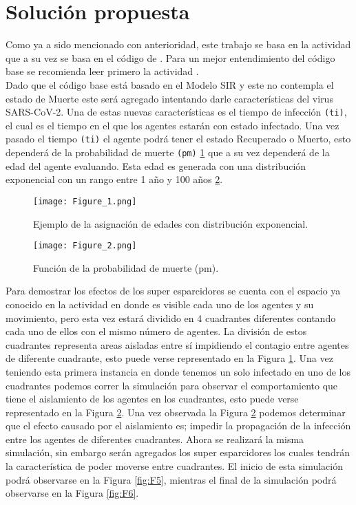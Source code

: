 \documentclass[final,6p,times,twocolumn]{elsarticle}
\begin{document}

\section{Solución propuesta}
\label{S:Sprop}
Como ya a sido mencionado con anterioridad, este trabajo se basa en la actividad \cite{VO-P6} que a su vez se basa en el código de \citet{DRA.Code}. Para un mejor entendimiento del código base se recomienda leer primero la actividad  \cite{VO-P6}.\\


Dado que el código base está basado en el Modelo SIR y este no contempla el estado de Muerte este  será agregado intentando darle características del virus SARS-CoV-2. Una de estas nuevas características es el tiempo de infección \texttt{(ti)}, el cual es el tiempo en el que los agentes estarán con estado infectado. Una vez pasado el tiempo \texttt{(ti)} el agente podrá tener el estado Recuperado o Muerto, esto dependerá de la probabilidad de muerte \texttt{(pm)} \ref{fig:F1}  que a su vez dependerá de la edad del agente evaluando. Esta edad es generada con una distribución exponencial con un rango entre 1 año y 100 años \ref{fig:F2}. 


\begin{figure}
\label{fig:F1}
\centering
\texttt{[image: Figure\_1.png]}
\caption{Ejemplo de la asignación de edades con distribución exponencial.}
\end{figure}

\begin{figure}
\label{fig:F2}
\centering
\texttt{[image: Figure\_2.png]}
\caption{Función de la probabilidad de muerte (pm).}
\end{figure}
 

Para demostrar los efectos de los super esparcidores se cuenta con el espacio ya conocido en la actividad \cite{VO-P6} en donde es visible cada uno de los agentes y su movimiento, pero esta vez estará dividido en 4 cuadrantes diferentes contando cada uno de ellos con el mismo número de agentes. La división de estos cuadrantes representa areas aisladas entre sí impidiendo el contagio entre agentes de diferente cuadrante, esto puede verse representado en la Figura \ref{fig:F1}. Una vez teniendo esta primera instancia en donde tenemos un solo infectado en uno de los cuadrantes podemos correr la simulación para observar el comportamiento que tiene el aislamiento de los agentes en los cuadrantes, esto puede verse representado en la Figura \ref{fig:F2}. Una vez observada la Figura \ref{fig:F2} podemos determinar que el efecto causado por el aislamiento es; impedir la propagación de la infección entre los agentes de diferentes cuadrantes. Ahora se realizará la misma simulación, sin embargo serán agregados los super esparcidores los cuales tendrán la característica de poder moverse entre cuadrantes. El inicio de esta simulación podrá observarse en la Figura \ref{fig:F5}, mientras el final de la simulación podrá observarse en la Figura  \ref{fig:F6}.
\end{document}
